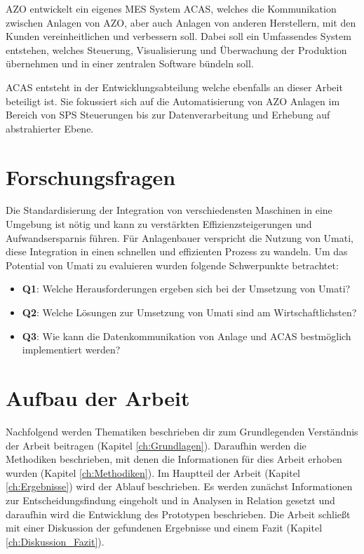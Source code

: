 \documentclass[a4paper, 12pt, oneside]{scrbook}
\begin{document}
	 AZO entwickelt ein eigenes MES System ACAS, welches die Kommunikation zwischen Anlagen von AZO, aber auch Anlagen von anderen Herstellern, mit den Kunden vereinheitlichen und verbessern soll. Dabei soll ein Umfassendes System entstehen, welches Steuerung, Visualisierung und Überwachung der Produktion übernehmen und in einer zentralen Software bündeln soll.
	
	 ACAS entsteht in der Entwicklungsabteilung welche ebenfalls an dieser Arbeit beteiligt ist. Sie fokussiert sich auf die Automatisierung von AZO Anlagen im Bereich von SPS Steuerungen bis zur Datenverarbeitung und Erhebung auf abstrahierter Ebene. 
	
	
	\section{Forschungsfragen}
	
	Die Standardisierung der Integration von verschiedensten Maschinen in eine Umgebung ist nötig und kann zu verstärkten Effizienzsteigerungen und Aufwandsersparnis führen. Für Anlagenbauer verspricht die Nutzung von Umati, diese Integration in einen schnellen und effizienten Prozess zu wandeln. Um das Potential von Umati zu evaluieren wurden folgende Schwerpunkte betrachtet:
	
	\begin{itemize}
		\item \textbf{Q1}: Welche Herausforderungen ergeben sich bei der Umsetzung von Umati?
		\item \textbf{Q2}: Welche Lösungen zur Umsetzung von Umati sind am Wirtschaftlichsten?
		\item \textbf{Q3}: Wie kann die Datenkommunikation von Anlage und ACAS bestmöglich implementiert werden?
	\end{itemize}
	
	\section{Aufbau der Arbeit}
	
	Nachfolgend werden Thematiken beschrieben dir zum Grundlegenden Verständnis der Arbeit beitragen (Kapitel \ref{ch:Grundlagen}). Daraufhin werden die Methodiken beschrieben, mit denen die Informationen für dies Arbeit erhoben wurden (Kapitel \ref{ch:Methodiken}). Im Hauptteil der Arbeit (Kapitel \ref{ch:Ergebnisse}) wird der Ablauf beschrieben. Es werden zunächst Informationen zur Entscheidungsfindung eingeholt und in Analysen in Relation gesetzt und daraufhin wird die Entwicklung des Prototypen beschrieben. Die Arbeit schließt mit einer Diskussion der gefundenen Ergebnisse und einem Fazit (Kapitel \ref{ch:Diskussion_Fazit}).
\end{document}
